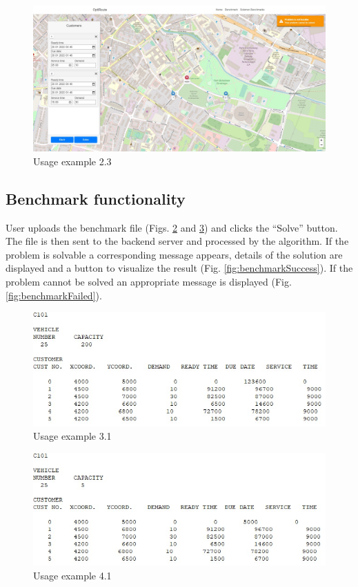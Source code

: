 \documentclass[a4paper,twoside,12pt]{book}
\begin{document}
\begin{figure}[htbp]
\centering
\includegraphics[width=\textwidth]{images/solutionFailed.jpg}
\caption{Usage example 2.3}
\label{fig:solutionFailed}
\end{figure}

\subsection{Benchmark functionality}
User uploads the benchmark file (Figs. \ref{fig:benchmarkFile1} and \ref{fig:benchmarkFile2}) and clicks the ``Solve'' button. The file is then sent to the backend server and processed by the algorithm. If the problem is solvable a corresponding message appears, details of the solution are displayed and a button to visualize the result (Fig. \ref{fig:benchmarkSuccess}). If the problem cannot be solved an appropriate message is displayed (Fig. \ref{fig:benchmarkFailed}).

\begin{figure}[htbp]
\centering
\includegraphics[scale=0.7]{images/benchmarkFile1.jpg}
\caption{Usage example 3.1}
\label{fig:benchmarkFile1}
\end{figure}

\begin{figure}[htbp]
\centering
\includegraphics[scale=0.7]{images/benchmarkFile2.jpg}
\caption{Usage example 4.1}
\label{fig:benchmarkFile2}
\end{figure}
\end{document}

